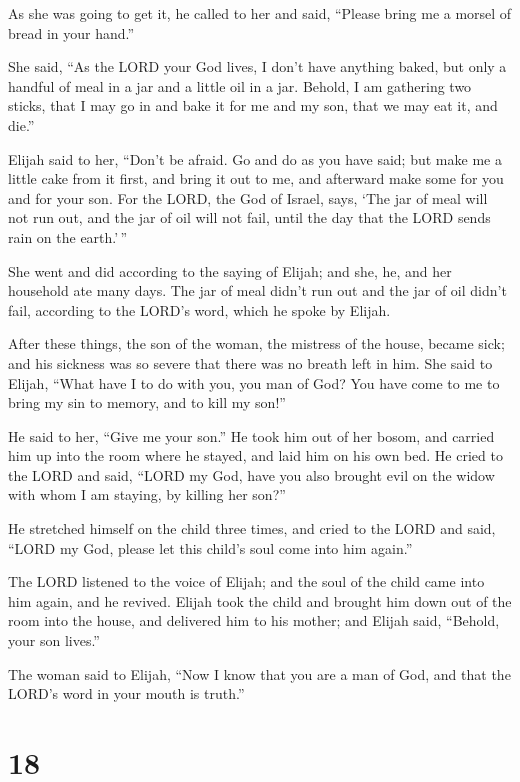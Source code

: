  As she was going to get it, he called to her and said,
``Please bring me a morsel of bread in your hand.''

 She said, ``As the LORD your God lives, I don't have
anything baked, but only a handful of meal in a jar and a little oil in
a jar. Behold, I am gathering two sticks, that I may go in and bake it
for me and my son, that we may eat it, and die.''

 Elijah said to her, ``Don't be afraid. Go and do as you
have said; but make me a little cake from it first, and bring it out to
me, and afterward make some for you and for your son. 
For the LORD, the God of Israel, says, `The jar of meal will not run
out, and the jar of oil will not fail, until the day that the LORD sends
rain on the earth.'\,''

 She went and did according to the saying of Elijah; and
she, he, and her household ate many days.  The jar of
meal didn't run out and the jar of oil didn't fail, according to the
LORD's word, which he spoke by Elijah.

 After these things, the son of the woman, the mistress
of the house, became sick; and his sickness was so severe that there was
no breath left in him.  She said to Elijah, ``What have I
to do with you, you man of God? You have come to me to bring my sin to
memory, and to kill my son!''

 He said to her, ``Give me your son.'' He took him out of
her bosom, and carried him up into the room where he stayed, and laid
him on his own bed.  He cried to the LORD and said,
``LORD my God, have you also brought evil on the widow with whom I am
staying, by killing her son?''

 He stretched himself on the child three times, and cried
to the LORD and said, ``LORD my God, please let this child's soul come
into him again.''

 The LORD listened to the voice of Elijah; and the soul
of the child came into him again, and he revived.  Elijah
took the child and brought him down out of the room into the house, and
delivered him to his mother; and Elijah said, ``Behold, your son
lives.''

 The woman said to Elijah, ``Now I know that you are a
man of God, and that the LORD's word in your mouth is truth.''

\hypertarget{section-17}{%
\section{18}\label{section-17}}

